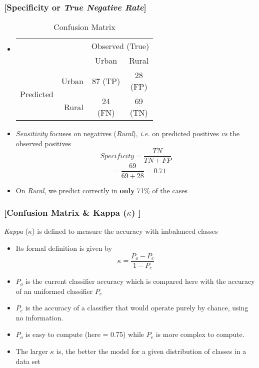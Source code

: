 \documentclass[xcolor=x11names,compress, handhouts]{beamer}
\renewcommand{\(}{\begin{columns}}
\renewcommand{\)}{\end{columns}}
\newcommand{\<}[1]{\begin{column}{#1}}
\renewcommand{\>}{\end{column}}
\begin{document}
\begin{frame} %
\frametitle{\textcolor{brique}{[Specificity or \textit{True Negative Rate}]}}
\begin{itemize}[<+->]
  \item[]
    \begin{table}[]
    \begin{tabular}{l r|c|c|}

                              & & \multicolumn{2}{c|}{Observed (True)}                                                                                          \\
                              & &    Urban  &  Rural  \\  \hline
    \multirow{2}{*}{Predicted}& Urban & \shortstack[c]{$87$ \\ \tiny{(TP)}}& \shortstack[c]{28 \\ \tiny{(FP)}} \\ \cline{2-4}
                              & Rural &  \shortstack[c]{24 \\ \tiny{(FN)}}& \shortstack[c]{69 \\ \tiny{(TN)}} \\ \hline
    \end{tabular}
    \caption{Confusion Matrix}
    \end{table}
  \item \textit{Sensitivity} focuses on  negatives (\textit{Rural}), \textit{i.e.} on predicted positives \textit{vs} the observed positives 
   $$ Specificity = \frac{TN}{TN + FP} $$
   $$
 \; \; \;  =  \frac{69}{69+28} = 0.71
 $$
  \item On \textit{Rural}, we predict correctly in \textbf{only} 71\% of the cases
\end{itemize}
\end{frame}


\begin{frame} %
\frametitle{\textcolor{brique}{[Confusion Matrix  \& Kappa ($\kappa$) ]}}
\emph{Kappa} ($\kappa$) is defined to measure the accuracy with imbalanced classes
\begin{itemize}[<+->]
  \item[] Its formal definition is given by 
  $$ \kappa = \frac{P_o - P_e}{1 - P_e}  $$
  \item[]$P_o$ is the current classifier accuracy which is compared here with the accuracy of an uniformed classifier $P_e$
  \item[] $P_e$ is the accuracy of a classifier that would operate purely by chance, using no information.
  \item $P_o$ is easy to compute (here = 0.75) while  $P_e$  is more complex to compute. 
  \item  The larger $\kappa $ is, the better the model for a given distribution of classes in a data set
  \end{itemize}
\end{frame}
\end{document}
